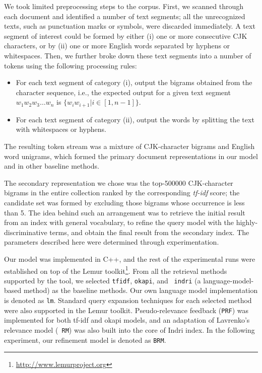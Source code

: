 We took limited preprocessing steps to the corpus.  First, we scanned through
each document and identified a number of text segments; all the unrecognized
texts, such as punctuation marks or symbols, were discarded immediately.  A
text segment of interest could be formed by either (i) one or more consecutive
CJK characters, or by (ii) one or more English words separated by hyphens or
whitespaces.  Then, we further broke down these text segments into a number of
tokens using the following processing rules:  \begin{itemize} \item For each
text segment of category (i), output the bigrams obtained from the character
sequence, i.e., the expected output for a given text segment $w_1 w_2 w_3
\ldots w_n$ is $\{ w_i w_{i+1} | i \in [1, n-1] \}$.  \item For each text
segment of category (ii), output the words by splitting the text with
whitespaces or hyphens.  \end{itemize} The resulting token stream was a mixture
of CJK-character bigrams and English word unigrams, which formed the primary
document representations in our model and in other baseline methods.  

The secondary representation we chose was the top-500000 CJK-character bigrams
in the entire collection ranked by the corresponding \emph{tf-idf} score; the
candidate set was formed by excluding those bigrams whose occurrence is less
than 5.  The idea behind such an arrangement was to retrieve the initial result
from an index with general vocabulary, to refine the query model with the
highly-discriminative terms, and obtain the final result from the secondary
index.  The parameters described here were determined through experimentation.

Our model was implemented in C++, and the rest of the experimental runs were
established on top of the Lemur
toolkit\footnote{\url{http://www.lemurproject.org}}.  From all the retrieval
methods supported by the tool, we selected {\tt tfidf}, {\tt okapi}, and {\tt
indri} (a language-model-based method) as the baseline methods.  Our own
language model implementation is denoted as {\tt lm}.  Standard query expansion
techniques for each selected method were also supported in the Lemur toolkit.
Pseudo-relevance feedback ({\tt PRF}) was implemented for both
tf-idf and okapi models, and an adaptation of Lavrenko's relevance model ({\tt
RM}) was also built into the core of Indri index.  In the following experiment,
our refinement model is denoted as {\tt BRM}.  

